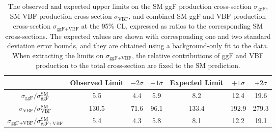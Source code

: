 \begin{table}[!tbh]
\renewcommand{\arraystretch}{1.5} %
	\centering
	\caption{The observed and expected upper limits on the SM ggF \HH production cross-section $\sigma_{\text{ggF}}$, SM VBF \HH production cross-section $\sigma_{\text{VBF}}$, and combined SM ggF and VBF \HH production cross-section $\sigma_{\text{ggF+VBF}}$ at the 95\% CL, expressed as ratios to the corresponding SM cross-sections.
	The expected values are shown with corresponding one and two standard deviation error bounds, and they are obtained using a background-only fit to the data.
	When extracting the limits on $\sigma_{\text{ggF+VBF}}$, the relative contributions of ggF and VBF production to the total cross-section are fixed to the SM prediction.}
	\begin{tabular}{c S S S S S S[table-format=3.1,table-number-alignment=center]}
		\toprule
		  & \textbf{Observed Limit} & \textbf{$-2\sigma$} & \textbf{$-1\sigma$} & \textbf{Expected Limit} & \textbf{$+1\sigma$} & \textbf{$+2\sigma$}\\
		\hline


		$\sigma_{\text{ggF}}/\sigma^{\text{SM}}_{\text{ggF}}$ & 5.5 & 4.4 & 5.9 & 8.2 & 12.4 & 19.6  \\
    $\sigma_{\text{VBF}}/\sigma^{\text{SM}}_{\text{VBF}}$ & 130.5  & 71.6 & 96.1 & 133.4 & 192.9 & 279.3  \\
    $\sigma_{\text{ggF+VBF}}/\sigma^{\text{SM}}_{\text{ggF+VBF}}$ & 5.4 & 4.3 & 5.8 & 8.1 & 12.2 & 19.1  \\

		\bottomrule

	\end{tabular}
\label{tab:all-sm-xs-tab}
\renewcommand{\arraystretch}{1.0} %
\end{table}
